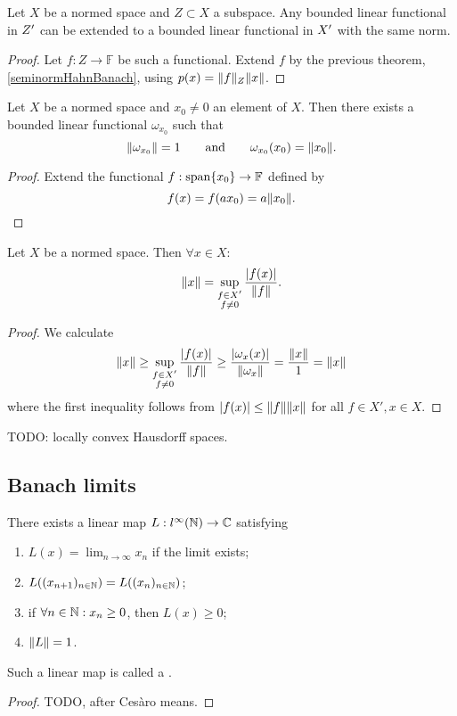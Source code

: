 \begin{corollary}
Let $X$ be a normed space and $Z\subset X$ a subspace. Any bounded linear functional in ${Z}^\prime$ can be extended to a bounded linear functional in ${X}^\prime$ with the same norm.
\end{corollary}
\begin{proof}
Let $f:Z\to \mathbb{F}$ be such a functional. Extend $f$ by the previous theorem, \ref{seminormHahnBanach}, using $p(x) = \lVert f\rVert_Z\lVert x\rVert$.
\end{proof}
\begin{corollary} \label{existenceBoundedFunctionalOfSameNorm}
Let $X$ be a normed space and $x_0\neq 0$ an element of $X$. Then there exists a bounded linear functional $\omega_{x_0}$ such that
\[ \lVert\omega_{x_0}\rVert = 1 \qquad \text{and} \qquad \omega_{x_0}(x_0)=\lVert x_0\rVert. \]
\end{corollary}
\begin{proof}
Extend the functional $f: \operatorname{span}\{x_0\}\to \mathbb{F}$ defined by
\[ f(x) = f(ax_0) = a\lVert x_0\rVert. \]
\end{proof}
\begin{corollary}
Let $X$ be a normed space. Then $\forall x\in X:$
\[ \lVert x\rVert = \sup_{\substack{f\in X' \\ f\neq 0}}\frac{|f(x)|}{\lVert f\rVert}. \]
\end{corollary}
\begin{proof}
We calculate
\[ \lVert x\rVert \geq \sup_{\substack{f\in X' \\ f\neq 0}}\frac{|f(x)|}{\lVert f\rVert} \geq \frac{|\omega_{x}(x)|}{\lVert\omega_{x}\rVert} = \frac{\lVert x\rVert}{1} = \lVert x\rVert \]
where the first inequality follows from $|f(x)|\leq \lVert f\rVert\lVert x\rVert$ for all $f\in X', x\in X$.
\end{proof}

TODO: locally convex Hausdorff spaces.

\subsection{Banach limits}
\begin{proposition}
There exists a linear map $L:l^\infty(\mathbb{N}) \to \mathbb{C}$ satisfying
\begin{enumerate}
\item $\displaystyle L(x) = \lim_{n\to \infty}x_n$ if the limit exists;
\item $L((x_{n+1})_{n\in\mathbb{N}}) = L((x_n)_{n\in\mathbb{N}})$;
\item if $\forall n\in\mathbb{N}:x_n\geq 0$, then $L(x) \geq 0$;
\item $\lVert L\rVert = 1$.
\end{enumerate}
Such a linear map is called a .
\end{proposition}
\begin{proof}
TODO, after Cesàro means.
\end{proof}

